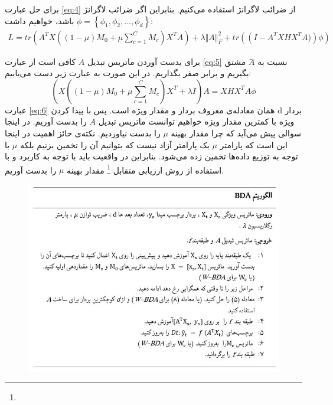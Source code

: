 {{{ 		    برای حل عبارت 
 		    \ref{eq:4}
 		    از ضرائب لاگرانژ استفاده می‌کنیم. بنابراین اگر ضرائب لاگرانژ 
 		    $\phi = \left\lbrace \phi_1, \phi_2, ... , \phi_d \right\rbrace  $
 		    باشد، خواهیم داشت: 
 		    \begin{equation}
 		    	\begin{aligned}
 		    	L = tr \left( A^{T}X \left( \left( 1 - \mu \right) M_{0} + \mu \sum _{c=1\mathrm{ }}^{C}M_{c} \right) X^{T}A \right) + \lambda \Vert A \Vert_{F}^{2} + tr \left( \left( I -  A^{T}XHX^{T}A)\right) \phi \right) 
 		    	\label{eq:5}
 		    	\end{aligned}
 		    \end{equation}
 		    
 		    برای بدست آوردن ماتریس تبدیل $A$ کافی است از عبارت
 		    \ref{eq:5}
 		    نسبت به $َA$ مشتق بگیریم و برابر صفر بگذاریم. در این صورت به عبارت زیر دست می‌یابیم:
 		    \begin{equation}
 		    	\left( X \left( \left( 1 - \mu \right) M_{0} + \mu \sum _{c=1\mathrm{ }}^{C}M_{c} \right) X^{T} + \lambda I \right) A = XHX^{T}A \phi
 		    	\label{eq:6}
 		    \end{equation}
 		 	عبارت 
 		 	\ref{eq:6}
 		 	همان معادله‌ی معروف بردار و مقدار ویژه است. پس با پیدا کردن d بردار ویژه با کمترین مقدار ویژه خواهیم توانست ماتریس تبدیل $A$ را بدست آوریم. در اینجا سوالی پیش می‌آید که چرا مقدار بهینه
 		 	$\mu$
 		 	 را بدست نیاوردیم. نکته‌ی حائز اهمیت در اینجا این است که پارامتر 
 		 	$\mu$
 		 	 یک پارامتر آزاد نیست که بتوانیم آن را تخمین بزنیم بلکه 
 		 	$\mu$
 		 	 با توجه به توزیع داده‌ها تخمین زده می‌شود. بنابراین در واقعیت باید با توجه به کاربرد و با استفاده از روش ارزیابی متقابل
 		 	 \footnote{}
 		 	  مقدار بهینه 
 		 	$\mu$
 		 	 را بدست آوریم.
 		 	 \begin{figure}
 		 	 	\centering
 		 	 	\includegraphics[scale=0.5]{images/table1.jpg}
 		 	 	\caption{}
 		 	 	\label{fig:5}
 		 	 \end{figure}
 		}
}}

